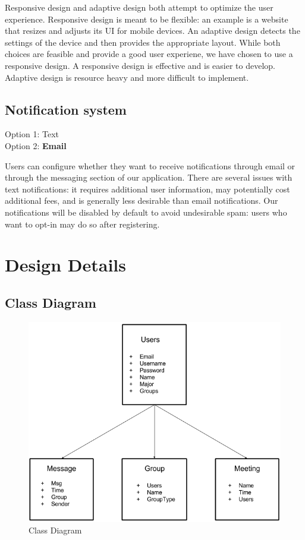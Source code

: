 \documentclass[12pt]{article}
\newcommand{\br}{\vspace{2mm}}
\begin{document}
\br

Responsive design and adaptive design both attempt to optimize the user experience. Responsive design is meant to be flexible: an example is a website that resizes and adjusts its UI for mobile devices. An adaptive design detects the settings of the device and then provides the appropriate layout. While both choices are feasible and provide a good user experiene, we have chosen to use a responsive design. A responsive design is effective and is easier to develop. Adaptive design is resource heavy and more difficult to implement.

\subsection*{Notification system}

\noindent
Option 1: Text \\
Option 2: \textbf{Email}

\br

Users can configure whether they want to receive notifications through email or through the messaging section of our application. There are several issues with text notifications: it requires additional user information, may potentially cost additional fees, and is generally less desirable than email notifications. Our notifications will be disabled by default to avoid undesirable spam: users who want to opt-in may do so after registering.

\section{Design Details}
\subsection*{Class Diagram}

\begin{figure}[H]
\centering
\includegraphics[width=.5\textwidth]{class-diagram}
\caption{Class Diagram}
\end{figure}
\end{document}
